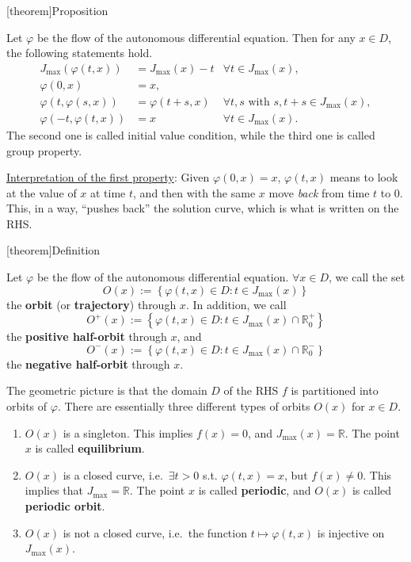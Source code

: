 \documentclass[12pt]{report}
\theoremstyle{definition}
\begin{document}
[theorem]{Proposition}
\begin{properties of the flow}
    Let $\varphi$ be the flow of the autonomous differential equation.
    Then for any $x\in D$, the following statements hold.
    \begin{align*}
        J_{\text{max}}(\varphi(t,x))& =J_{\text{max}}(x)-t
                                    & \forall t\in J_{\text{max}}(x), \\
        \varphi(0,x)&=x, \\
        \varphi(t,\varphi(s,x))&=\varphi(t+s,x)
                               & \forall t,s \text{ with }s,t+s\in J_{\text{max}}(x),\\
        \varphi(-t,\varphi(t,x))&=x
                                & \forall t\in J_{\text{max}}(x).
    \end{align*} 
    The second one is called initial value condition, while the third one is
    called group property.
\end{properties of the flow}
\underline{Interpretation of the first property}:
Given $\varphi(0,x)=x$, $\varphi(t,x)$ means to look at the value of $x$
at time $t$, and then with the same $x$ move \emph{back} from time $t$ to 0.
This, in a way, ``pushes back'' the solution curve, which is what is written on
the RHS.

[theorem]{Definition}
\begin{orbits or trajectories}
    Let $\varphi$ be the flow of the autonomous differential equation.
    $\forall x\in D$, we call the set
    \[
        O(x):=\left\{\varphi(t,x)\in D:t\in J_{\text{max}}(x)\right\}
    \]
    the \textbf{orbit} (or \textbf{trajectory}) through $x$.
    In addition, we call 
    \[
        O^+(x):=\left\{\varphi(t,x)\in D:t\in
        J_{\text{max}}(x)\cap\mathbb{R}_0^+\right\}
    \]
    the \textbf{positive half-orbit} through $x$, and 
    \[
        O^-(x):=\left\{\varphi(t,x)\in D:t\in
        J_{\text{max}}(x)\cap\mathbb{R}_0^-\right\}
    \]
    the \textbf{negative half-orbit} through $x$.
\end{orbits or trajectories}
The geometric picture is that the domain $D$ of the RHS $f$ is partitioned into
orbits of $\varphi$. There are essentially three different types of orbits
$O(x)$ for $x\in D$.
\begin{enumerate}[label = (\roman*)]
    \item $O(x)$ is a singleton. This implies $f(x)=0$, and
        $J_{\text{max}}(x)=\mathbb{R}$. The point $x$ is called
        \textbf{equilibrium}.
    \item $O(x)$ is a closed curve, i.e.\ $\exists t>0$ s.t. $\varphi(t,x)=x$,
        but $f(x)\neq 0$. This implies that $J_{\text{max}}=\mathbb{R}$.
        The point $x$ is called \textbf{periodic}, and $O(x)$ is called
        \textbf{periodic orbit}.
    \item $O(x)$ is not a closed curve, i.e.\ the function $t\mapsto
        \varphi(t,x)$ is injective on $J_{\text{max}}(x)$.
\end{enumerate} 
\end{document}

